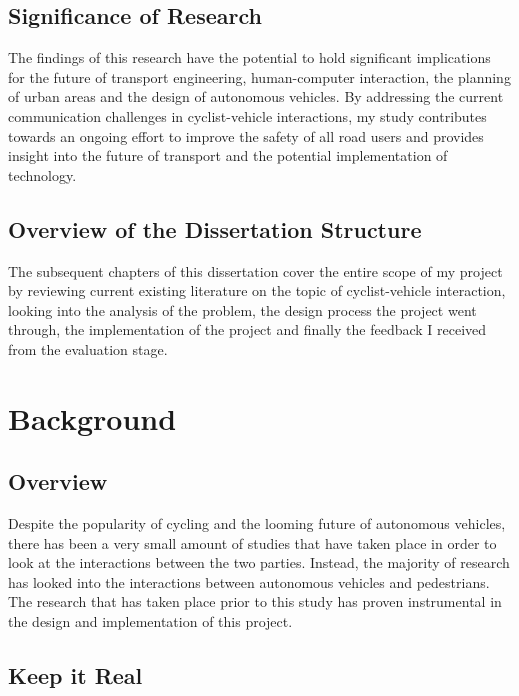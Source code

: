 \documentclass{l4proj}
\begin{document}
\section{Significance of Research}
The findings of this research have the potential to hold significant implications for the future of transport engineering, human-computer interaction, the planning of urban areas and the design of autonomous vehicles. By addressing the current communication challenges in cyclist-vehicle interactions, my study contributes towards an ongoing effort to improve the safety of all road users and provides insight into the future of transport and the potential implementation of technology.

\section{Overview of the Dissertation Structure}
The subsequent chapters of this dissertation cover the entire scope of my project by reviewing current existing literature on the topic of cyclist-vehicle interaction, looking into the analysis of the problem, the design process the project went through, the implementation of the project and finally the feedback I received from the evaluation stage.


\chapter{Background}

\section{Overview}

Despite the popularity of cycling and the looming future of autonomous vehicles, there has been a very small amount of studies that have taken place in order to look at the interactions between the two parties. Instead, the majority of research has looked into the interactions between autonomous vehicles and pedestrians. The research that has taken place prior to this study has proven instrumental in the design and implementation of this project.

\section{Keep it Real \citep{keep_it_real}}
\end{document}
